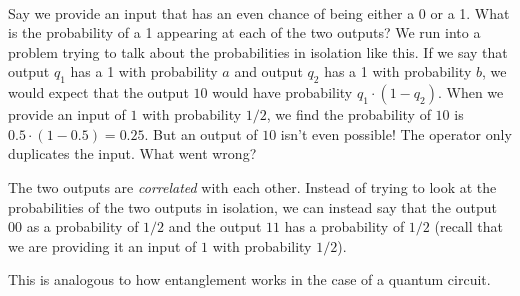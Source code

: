 \documentclass[runningheads]{llncs}
\begin{document}
\begin{minipage}{.5\textwidth}
    \centering
{}
\end{minipage}
\\

Say we provide an input that has an even chance of being either a 0 or a 1. What is the probability of a 1 appearing at each of the two outputs?
We run into a problem trying to talk about the probabilities in isolation like this. If we say that output $q_1$ has a 1 with probability
$a$ and output $q_2$ has a 1 with probability $b$, we would expect that the output $10$ would have probability $q_1 \cdot (1 - q_2)$. When
we provide an input of $1$ with probability $1/2$, we find the probability of $10$ is $0.5 \cdot (1 - 0.5) = 0.25$. But an
output of $10$ isn't even possible! The operator only duplicates the input. What went wrong?

The two outputs are \textit{correlated} with each other. Instead of trying to look at the probabilities of the two outputs in isolation, we can
instead say that the output $00$ as a probability of $1/2$ and the output $11$ has a probability of $1/2$ (recall that we are providing it an input of $1$ with probability $1/2$).

This is analogous to how entanglement works in the case of a quantum circuit.
\end{document}

